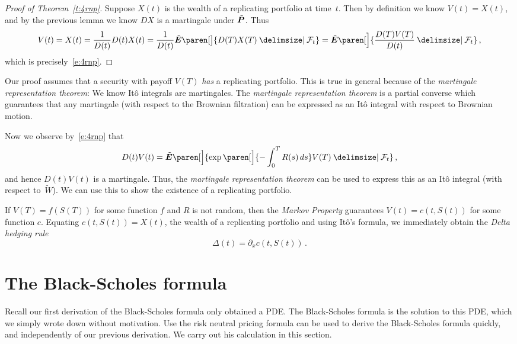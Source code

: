\begin{proof}[Proof of Theorem~\ref{t:4rnp}]
  Suppose $X(t)$ is the wealth of a replicating portfolio at time~$t$.
  Then by definition we know $V(t) = X(t)$, and by the previous lemma we know $DX$ is a martingale under $\tilde\P$.
  Thus
  \begin{equation*}
    V(t)
      = X(t)
      = \frac{1}{D(t)} D(t) X(t)
      = \frac{1}{D(t)} \tilde\E\paren[\big]{ D(T) X(T) \given \mathcal F_t }
      = \tilde\E\paren[\Big]{
	  \frac{D(T) V(T)}{D(t)} \given \mathcal F_t }\,,
  \end{equation*}
  which is precisely~\eqref{e:4rnp}.
\end{proof}
\begin{remark}
  Our proof assumes that a security with payoff $V(T)$ \emph{has} a replicating portfolio.
  This is true in general because of the \emph{martingale representation theorem}: We know It\^o integrals are martingales. The \emph{martingale representation theorem} is a partial converse which guarantees that any martingale (with respect to the Brownian filtration) can be expressed as an It\^o integral with respect to Brownian motion.

  Now we observe by~\eqref{e:4rnp} that
  \begin{equation*}
    D(t) V(t) = \tilde\E \paren[\Big]{\exp\paren[\Big]{-\int_0^T R(s) \, ds} V(T) \given \mathcal F_t }\,,
  \end{equation*}
  and hence $D(t) V(t)$ is a martingale.
  Thus, the \emph{martingale representation theorem} can be used to express this as an It\^o integral (with respect to~$\tilde W$).
  We can use this to show the existence of a replicating portfolio.
\end{remark}
\begin{remark}
  If $V(T) = f(S(T))$ for some function $f$ and $R$ is not random, then the \emph{Markov Property} guarantees $V(t) = c(t, S(t))$ for some function $c$.
  Equating $c(t, S(t)) = X(t)$, the wealth of a replicating portfolio and using It\^o's formula, we immediately obtain the \emph{Delta hedging rule}
  \begin{equation*}
    \Delta(t) = \partial_x c(t, S(t))\,.
  \end{equation*}
\end{remark}
\section{The Black-Scholes formula}

Recall our first derivation of the Black-Scholes formula only obtained a PDE.
The Black-Scholes formula is the solution to this PDE, which we simply wrote down without motivation.
Use the risk neutral pricing formula can be used to derive the Black-Scholes formula quickly, and independently of our previous derivation.
We carry out his calculation in this section.


